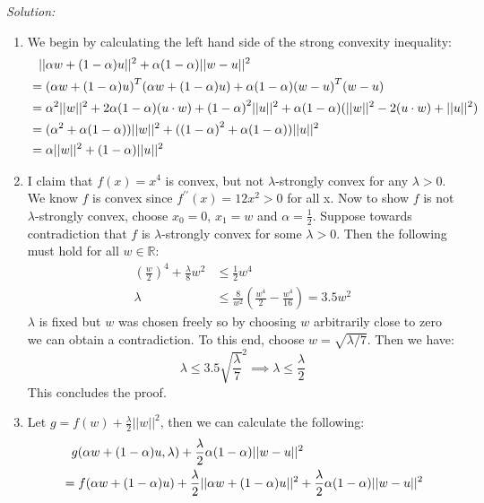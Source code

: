 \documentclass[
10pt, %
a4paper, %
oneside, %
headinclude,footinclude, %
BCOR5mm, %
]{scrartcl}
\newenvironment{solution}
               {\textit{Solution:}}
               {}
\begin{document}
\begin{solution}
  \begin{enumerate}[label= (\alph*)]
      \item We begin by calculating the left hand side of the strong convexity inequality:
        \begin{align*}
        &\hphantom{=} ||\alpha w + (1-\alpha)u||^2 + \alpha(1-\alpha)||w-u||^2 \\
        &= {(\alpha w + (1-\alpha)u)}^T(\alpha w + (1-\alpha)u) + \alpha(1-\alpha){(w-u)}^T(w-u) \\
        &= \alpha^2||w||^2 + 2\alpha(1-\alpha)(u\cdot w) + {(1-\alpha)}^2||u||^2 + \alpha(1-\alpha)(||w||^2 - 2(u\cdot w) + ||u||^2) \\
        &= (\alpha^2+\alpha(1-\alpha))||w||^2 + ({(1-\alpha)}^2 + \alpha(1-\alpha))||u||^2 \\
        &= \alpha||w||^2 + (1-\alpha)||u||^2
        \end{align*}
      \item I claim that $f(x) = x^4$ is convex, but not $\lambda$-strongly convex for any $\lambda>0$. We know $f$ is convex since $f^{\prime\prime}(x) = 12x^2 > 0$ for all x.
        Now to show $f$ is not $\lambda$-strongly convex, choose $x_0=0$, $x_1=w$ and $\alpha=\frac{1}{2}$. Suppose towards contradiction that $f$ is $\lambda$-strongly convex for some $\lambda > 0$. Then the following must hold for all $w\in\mathbb{R}$:
        \begin{align*}
          {\left(\frac{w}{2}\right)}^4 + \frac{\lambda}{8}w^2 &\leq \frac{1}{2}w^4 \\
          \lambda &\leq \frac{8}{w^2}\left(\frac{w^4}{2} - \frac{w^4}{16}\right) = 3.5w^2
        \end{align*}
        $\lambda$ is fixed but $w$ was chosen freely so by choosing $w$ arbitrarily close to zero we can obtain a contradiction. To this end, choose $w = \sqrt{\lambda/7}$. Then we have:
        \[\lambda \leq 3.5\sqrt{\frac{\lambda}{7}}^2 \implies \lambda \leq \frac{\lambda}{2}\]
        This concludes the proof.
      \item Let $g = f(w) + \frac{\lambda}{2}||w||^2$, then we can calculate the following: \begin{align*}
        &\hphantom{=} g(\alpha w + (1-\alpha)u, \lambda) + \frac{\lambda}{2}\alpha(1-\alpha)||w-u||^2 \\
        &= f(\alpha w + (1-\alpha)u) + \frac{\lambda}{2}||\alpha w + (1-\alpha) u||^2 + \frac{\lambda}{2}\alpha(1-\alpha)||w-u||^2 \\

\end{align*}
\end{enumerate}
\end{solution}
\end{document}
